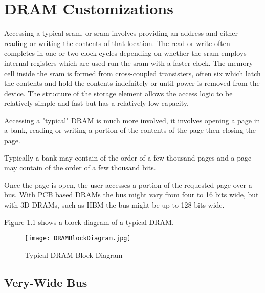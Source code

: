 
\chapter{DRAM Customizations}
\label{sec:DRAM Customizations}

Accessing a typical \acl{sram}, or \ac{sram} involves providing an address and either reading or writing the contents of that location. The read or write often completes in one or two clock cycles depending on whether the \ac{sram} employs internal registers which are used run the \ac{sram} with a faster clock.
The memory cell inside the \ac{sram} is formed from cross-coupled transisters, often six which latch the contents and hold the contents indefnitely or until power is removed from the device.
The structure of the storage element allows the access logic to be relatively simple and fast but has a relatively low capacity.

Accessing a "typical" DRAM is much more involved, it involves opening a page in a bank, reading or writing a portion of the contents of the page then closing the page. 

Typically a bank may contain of the order of a few thousand pages and a page may contain of the order of a few thousand bits.

Once the page is open, the user accesses a portion of the requested page over a bus. With PCB based DRAMs the bus might vary from four to 16 bits wide, but with 3D DRAMs, such as HBM the bus might be up to 128 bits wide.

Figure \ref{fig:dramBlockDiagram} shows a block diagram of a typical DRAM.

\begin{figure}[!t]
\centering
\captionsetup{justification=centering}
\centerline{
\mbox{\texttt{[image: DRAMBlockDiagram.jpg]}}
}
\caption{Typical DRAM Block Diagram}
\label{fig:dramBlockDiagram}
\end{figure}

\section{Very-Wide Bus}
\label{sec:Very-Wide Bus}

